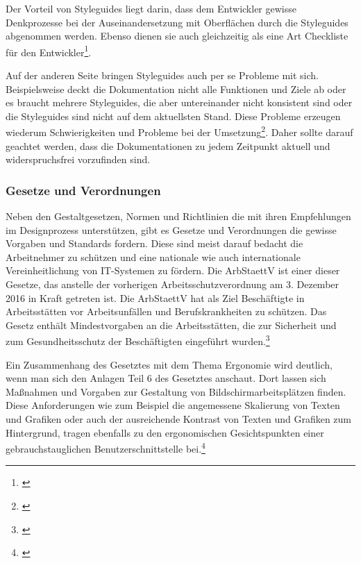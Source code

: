 Der Vorteil von Styleguides liegt darin, dass dem Entwickler gewisse Denkprozesse bei der Auseinandersetzung mit Oberflächen durch die Styleguides abgenommen werden. Ebenso dienen sie auch gleichzeitig als eine Art Checkliste für den Entwickler\footnote{\cite[vgl.][214]{Thomaschewski2013}}.

Auf der anderen Seite bringen Styleguides auch per se Probleme mit sich. Beispielsweise deckt die Dokumentation nicht alle Funktionen und Ziele ab oder es braucht mehrere Styleguides, die aber untereinander nicht konsistent sind oder die Styleguides sind nicht auf dem aktuellsten Stand. Diese Probleme erzeugen wiederum Schwierigkeiten und Probleme bei der Umsetzung\footnote{\cite[vgl.][215]{Thomaschewski2013}}. Daher sollte darauf geachtet werden, dass die Dokumentationen zu jedem Zeitpunkt aktuell und widerspruchsfrei vorzufinden sind.


\subsubsection{Gesetze und Verordnungen}
\label{sec:gesetzeUndVerordnungen}
Neben den Gestaltgesetzen, Normen und Richtlinien die mit ihren Empfehlungen im Designprozess unterstützen, gibt es Gesetze und Verordnungen die gewisse Vorgaben und Standards fordern. Diese sind meist darauf bedacht die Arbeitnehmer zu schützen und eine nationale wie auch internationale Vereinheitlichung von IT-Systemen zu fördern. Die \gls{ArbStaettV} ist einer dieser Gesetze, das anstelle der vorherigen Arbeitsschutzverordnung am 3. Dezember 2016 in Kraft getreten ist. Die \gls{ArbStaettV} hat als Ziel Beschäftigte in Arbeitsstätten vor Arbeitsunfällen und Berufskrankheiten zu schützen. Das Gesetz enthält Mindestvorgaben an die Arbeitsstätten, die zur Sicherheit und zum Gesundheitsschutz der Beschäftigten eingeführt wurden.\footnote{\cite[vgl.][]{BAuA}}

Ein Zusammenhang des Gesetztes mit dem Thema Ergonomie wird deutlich, wenn man sich den Anlagen Teil 6 des Gesetztes anschaut. Dort lassen sich Maßnahmen und Vorgaben zur Gestaltung von Bildschirmarbeitsplätzen finden. Diese Anforderungen wie zum Beispiel die angemessene Skalierung von Texten und Grafiken oder auch der ausreichende Kontrast von Texten und Grafiken zum Hintergrund, tragen ebenfalls zu den ergonomischen Gesichtspunkten einer gebrauchstauglichen Benutzerschnittstelle bei.\footnote{\cite[vgl.][Anhang: Kap. 6]{ArbStaettV}}


